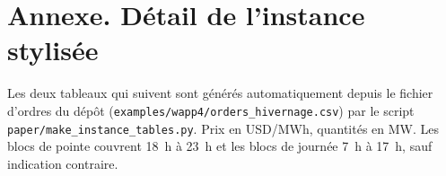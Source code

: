 \documentclass[a4paper,12pt]{article}
\theoremstyle{definition}
\begin{document}
\clearpage
\appendix
\section*{Annexe. Détail de l'instance stylisée}\label{sec:annexe}

Les deux tableaux qui suivent sont générés automatiquement depuis le fichier d'ordres du dépôt (\texttt{examples/wapp4/orders\_hivernage.csv}) par le script \texttt{paper/make\_instance\_tables.py}. Prix en USD/MWh, quantités en MW. Les blocs de pointe couvrent 18~h à 23~h et les blocs de journée 7~h à 17~h, sauf indication contraire.

\small

\normalsize

\clearpage


\end{document}
